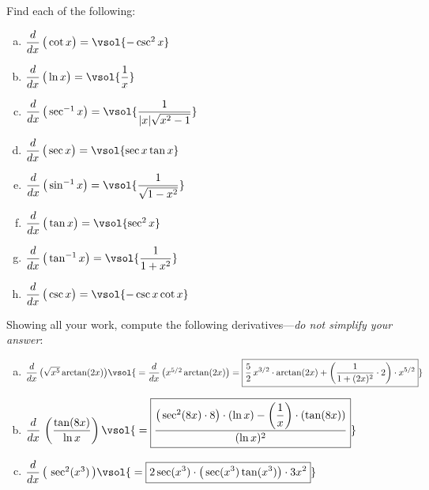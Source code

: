 \documentclass[12pt,letterpaper]{exam}
\begin{document}
\begin{questions}

\newpage
{} \par\vspace{0.3cm}
Find each of the following: \par\vspace{0.3cm}
	\begin{enumerate}[(a)]
	\item $\dfrac{d}{dx}\, \big( \cot x \big)= \vsol{-\csc^2 x}$ \vfill
	\item $\dfrac{d}{dx}\, \big( \ln x \big)= \vsol{\dfrac{1}{x}}$ \vfill
	\item $\dfrac{d}{dx}\, \big( \sec^{-1} x \big)= \vsol{\dfrac{1}{|x| \sqrt{x^2 - 1}}}$ \vfill
	\item $\dfrac{d}{dx}\, \big( \sec x \big)= \vsol{\sec x \tan x}$ \vfill
	\item $\dfrac{d}{dx}\, \big( \sin^{-1} x \big)= \vsol{\dfrac{1}{\sqrt{1 - x^2}}}$ \vfill
	\item $\dfrac{d}{dx}\, \big( \tan x \big)= \vsol{\sec^2 x}$ \vfill
	\item $\dfrac{d}{dx}\, \big( \tan^{-1} x \big)= \vsol{\dfrac{1}{1 + x^2}}$ \vfill
	\item $\dfrac{d}{dx}\, \big( \csc x \big)= \vsol{-\csc x \cot x}$
	\end{enumerate}



\newpage
{} \par\vspace{0.3cm}
 
Showing all your work, compute the following derivatives---{\itshape do not simplify your answer}: \par\vspace{0.75cm}
	\begin{enumerate}[(a)]
	\item $\dfrac{d}{dx} \,\big( \sqrt{x^5} \arctan(2x) \big) \vsol{\;= \dfrac{d}{dx} \left( x^{5/2} \arctan(2x) \right)= \boxed{\frac{5}{2}\, x^{3/2} \cdot \arctan(2x) + \left( \dfrac{1}{1 + (2x)^2} \cdot 2 \right) \cdot x^{5/2}}}$ \vfill
	\item $\dfrac{d}{dx} \, \left( \dfrac{\tan(8x)}{\ln x} \right) \vsol{\;= \boxed{\dfrac{\big( \sec^2(8x) \cdot 8 \big) \cdot \left( \ln x \right) - \left( \dfrac{1}{x} \right) \cdot \left( \tan(8x) \right)}{(\ln x)^2}}}$ \vfill
	\item $\dfrac{d}{dx} \, \big( \, \sec^2(x^3) \,\big) \vsol{\;= \boxed{2 \sec(x^3) \cdot \big( \sec(x^3) \tan(x^3) \big) \cdot 3x^2}}$ \vfill
	\end{enumerate}




\end{questions}
\end{document}
